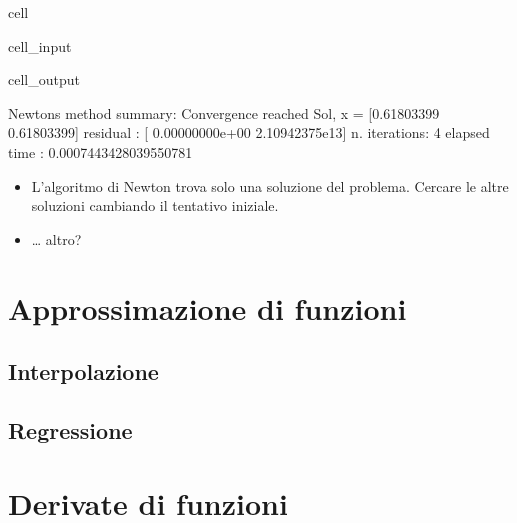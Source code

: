 \documentclass[letterpaper,10pt,italian]{jupyterBook}
\begin{document}
\begin{sphinxuseclass}{cell}
\begin{sphinxVerbatimInput}
\begin{sphinxuseclass}{cell_input}
\end{sphinxuseclass}\end{sphinxVerbatimInput}
\begin{sphinxVerbatimOutput}

\begin{sphinxuseclass}{cell_output}
\begin{sphinxVerbatim}[commandchars=\\\{\}]
Newton\PYGZsq{}s method summary: 
Convergence reached
Sol, x = [\PYGZhy{}0.61803399 \PYGZhy{}0.61803399]
residual     : [ 0.00000000e+00 \PYGZhy{}2.10942375e\PYGZhy{}13]
n. iterations: 4
elapsed time : 0.0007443428039550781
\end{sphinxVerbatim}

\end{sphinxuseclass}\end{sphinxVerbatimOutput}

\end{sphinxuseclass}\begin{itemize}
\item {} 
\sphinxAtStartPar
{} L’algoritmo di Newton trova solo una soluzione del problema. Cercare le altre soluzioni cambiando il tentativo iniziale.

\item {} 
\sphinxAtStartPar
{} … altro?

\end{itemize}

\sphinxstepscope


\chapter{Approssimazione di funzioni}
\label{\detokenize{ch/numerics/approximation:approssimazione-di-funzioni}}\label{\detokenize{ch/numerics/approximation::doc}}

\section{Interpolazione}
\label{\detokenize{ch/numerics/approximation:interpolazione}}

\section{Regressione}
\label{\detokenize{ch/numerics/approximation:regressione}}
\sphinxstepscope


\chapter{Derivate di funzioni}
\label{\detokenize{ch/numerics/derivatives:derivate-di-funzioni}}\label{\detokenize{ch/numerics/derivatives::doc}}
\end{document}
